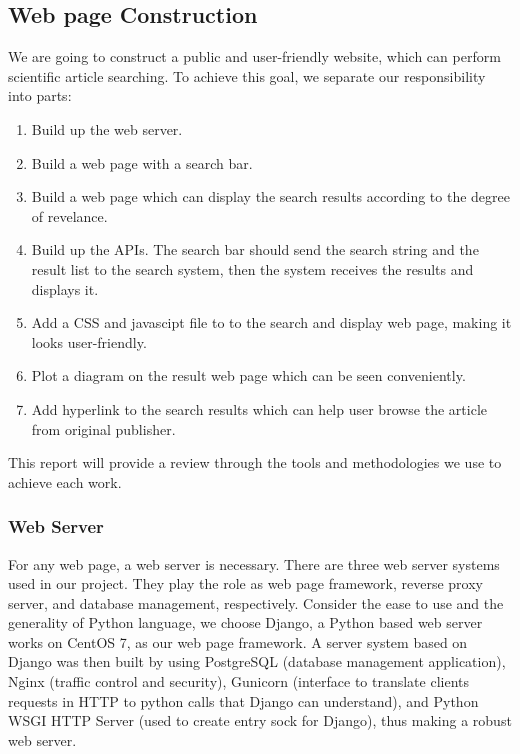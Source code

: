\subsection{Web page Construction}

We are going to construct a public and user-friendly website, which can perform scientific article searching.
To achieve this goal, we separate our responsibility into parts:\\
\begin{enumerate}
	\item Build up the web server.	
	\item Build a web page with a search bar.
	\item Build a web page which can display the search results according to the degree of revelance.
	\item Build up the APIs. The search bar should send the search string and the result list to the search system, 
	then the system receives the results and displays it.
	\item Add a CSS and javascipt file to to the search and display web page, making it looks user-friendly.
	\item Plot a diagram on the result web page which can be seen conveniently.
	\item Add hyperlink to the search results which can help user browse the article from original publisher.
\end{enumerate}
This report will provide a review through the tools and methodologies we use to achieve each work.
\subsubsection{Web Server}
For any web page, a web server is necessary.
There are three web server systems used in our project. 
They play the role as web page framework, reverse proxy server, 
and database management, respectively. 
Consider the ease to use and the generality of Python language, we choose Django, 
a Python based web server works on CentOS 7, as our web page framework. A server 
system based on Django was then built by using PostgreSQL (database management application), 
Nginx (traffic control and security), Gunicorn (interface to translate clients 
requests in HTTP to python calls that Django can understand), and Python WSGI HTTP 
Server (used to create entry sock for Django), thus making a robust web server.

